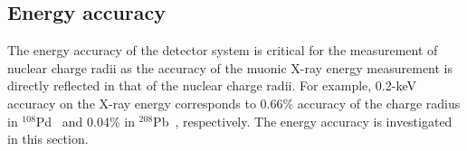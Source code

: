 \subsection{Energy accuracy}\label{sec:linearity}
The energy accuracy of the detector system is critical for the measurement of nuclear charge radii as the accuracy of the muonic X-ray energy measurement is directly reflected in that of the nuclear charge radii.
For example, 0.2-keV accuracy on the X-ray energy corresponds to 0.66\% accuracy of the charge radius in $^{108}$Pd~\cite{Saito2022-wl} and 0.04\% in $^{208}$Pb~\cite{Bergem1988-nf}, respectively.
The energy accuracy is investigated in this section.

